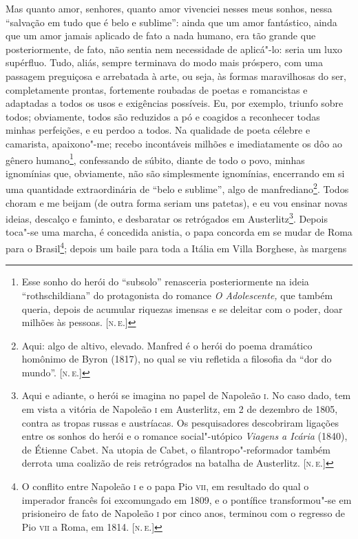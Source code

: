 Mas quanto amor, senhores, quanto amor vivenciei nesses meus sonhos,
nessa ``salvação em tudo que é belo e sublime'': ainda que um amor
fantástico, ainda que um amor jamais aplicado de fato a nada humano, era
tão grande que posteriormente, de fato, não sentia nem necessidade de
aplicá"-lo: seria um luxo supérfluo. Tudo, aliás, sempre terminava do
modo mais próspero, com uma passagem preguiçosa e arrebatada à arte, ou
seja, às formas maravilhosas do ser, completamente prontas, fortemente
roubadas de poetas e romancistas e adaptadas a todos os usos e
exigências possíveis. Eu, por exemplo, triunfo sobre todos; obviamente,
todos são reduzidos a pó e coagidos a reconhecer todas minhas
perfeições, e eu perdoo a todos. Na qualidade de poeta célebre e
camarista, apaixono"-me; recebo incontáveis milhões e imediatamente os
dôo ao gênero humano\footnote{Esse sonho do herói do ``subsolo''
  renasceria posteriormente na ideia ``rothschildiana'' do protagonista
  do romance \emph{O Adolescente,} que também queria, depois de acumular
  riquezas imensas e se deleitar com o poder, doar milhões às pessoas.
  {[}\textsc{n.\,e.}{]}}, confessando de súbito, diante de todo o povo, minhas
ignomínias que, obviamente, não são simplesmente ignomínias, encerrando
em si uma quantidade extraordinária de ``belo e sublime'', algo de
manfrediano\footnote{Aqui: algo de altivo, elevado. Manfred é o herói do
  poema dramático homônimo de Byron (1817), no qual se viu refletida a
  filosofia da ``dor do mundo''. {[}\textsc{n.\,e.}{]}}. Todos choram e me beijam
(de outra forma seriam uns patetas), e eu vou ensinar novas ideias,
descalço e faminto, e desbaratar os retrógados em Austerlitz\footnote{Aqui
  e adiante, o herói se imagina no papel de Napoleão \textsc{i}. No caso dado,
  tem em vista a vitória de Napoleão \textsc{i} em Austerlitz, em 2 de dezembro
  de 1805, contra as tropas russas e austríacas. Os pesquisadores
  descobriram ligações entre os sonhos do herói e o romance
  social"-utópico \emph{Viagens a Icária} (1840), de Étienne Cabet. Na
  utopia de Cabet, o filantropo"-reformador também derrota uma coalizão
  de reis retrógrados na batalha de Austerlitz. {[}\textsc{n.\,e.}{]}}. Depois
toca"-se uma marcha, é concedida anistia, o papa concorda em se mudar de
Roma para o Brasil\footnote{O conflito entre Napoleão \textsc{i} e o papa Pio
  \textsc{vii}, em resultado do qual o imperador francês foi excomungado em 1809,
  e o pontífice transformou"-se em prisioneiro de fato de Napoleão \textsc{i} por
  cinco anos, terminou com o regresso de Pio \textsc{vii} a Roma, em 1814. {[}\textsc{n.\,e.}{]}}; depois um baile para toda a Itália em Villa Borghese, às margens
